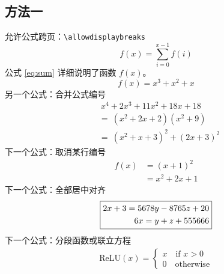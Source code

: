 \documentclass[a4paper, 12pt]{article} %
\numberwithin{equation}{section} %
\numberwithin{figure}{section} %
\begin{document}
        \subsection{方法一} \label{subsec:method1}
            允许公式跨页：\verb|\allowdisplaybreaks| 
            \begin{equation} \label{eq:sum}
                f(x) = \sum_{i=0}^{x-1} f(i)
            \end{equation}
            公式 \ref{eq:sum} 详细说明了函数 $f(x)$。 
            \begin{equation*} 
                f(x) = x^3 + x^2 + x
            \end{equation*}
            另一个公式：合并公式编号
            \begin{equation} \label{eq:align}
                \begin{split}  %
                &\ x^4+2x^3+11x^2+18x+18 \\
                &=\ (x^2+2x+2)(x^2+9) \\
                &=\ (x^2+x+3)^2+(2x+3)^2
                \end{split}
                \end{equation}
            下一个公式：取消某行编号
            \begin{align}
                f(x) &= (x+1)^2 \nonumber \\  %
                &= x^2 + 2x + 1
            \end{align}
            下一个公式：全部居中对齐
            \begin{gather} %
                \boxed{   %
                    \begin{split}
                        2x + 3 = 5678y - 8765z + 20 \\
                        6x = y + z + 555666
                    \end{split}
                }
            \end{gather}
            下一个公式：分段函数或联立方程
            \begin{align}
                \text{ReLU}(x) = 
                \begin{cases}
                    x \quad\text{if } x > 0 \\
                    0 \quad\text{otherwise}
                \end{cases}
            \end{align}
\end{document}
